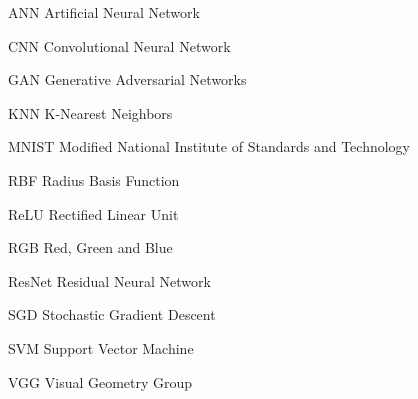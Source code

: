 \documentclass[
	12pt,				%
	oneside,			%
	a4paper,			%
	english,			%
	brazil				%
	]{abntex2ppgsi}
\begin{document}
\listoffigures*
\cleardoublepage


\listofquadros*
\cleardoublepage


\listoftables*
\cleardoublepage

%
%
\begin{siglas}
  \item[ANN] Artificial Neural Network
  \item[CNN] Convolutional Neural Network
  \item[GAN] Generative Adversarial Networks
  \item[KNN] K-Nearest Neighbors
  \item[MNIST] Modified National Institute of Standards and Technology
  \item[RBF] Radius Basis Function
  \item[ReLU] Rectified Linear Unit
  \item[RGB] Red, Green and Blue
  \item[ResNet] Residual Neural Network
  \item[SGD] Stochastic Gradient Descent
  \item[SVM] Support Vector Machine
  \item[VGG] Visual Geometry Group
\end{siglas}

%
% 

\end{document}
